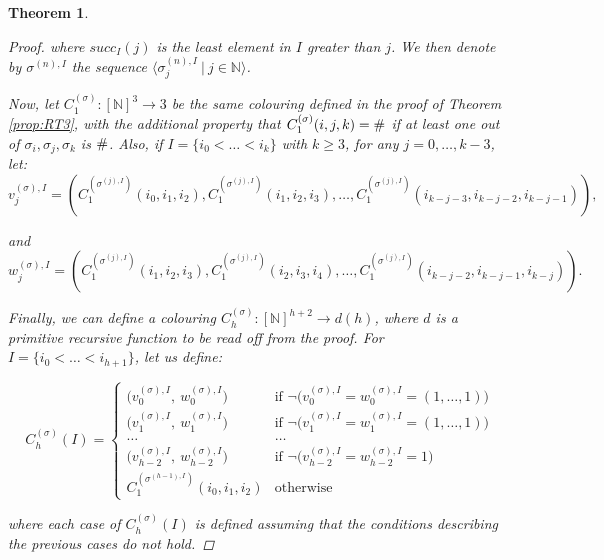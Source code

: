 \documentclass{amsart}
\newcommand\Nat{\mathbb{N}}
\newcommand\additionalsymbol{\text{\small{\#}}}
\newtheorem{theorem}{Theorem}
\begin{document}
\begin{theorem}
\begin{proof}
where $succ_I(j)$ is the least element in $I$ greater than $j$. 
We then denote by $\sigma^{(n),I}$ the sequence $\langle \sigma_j^{(n),I} \ |\ j \in \Nat \rangle$.


\medskip

Now, let $C_1^{(\sigma)}: [\Nat]^3 \rightarrow 3$ be the same colouring defined in the proof of Theorem \ref{prop:RT3}, with the additional property that $C_1^{(\sigma)}(i,j,k) = \additionalsymbol$ if at least one out of $\sigma_i, \sigma_j, \sigma_k$ is $\additionalsymbol$.
Also, if $I = \{i_0 < \ldots < i_k\}$ with $k \geq 3$, for any $j=0,\ldots,k-3$, let:
$$
v_j^{(\sigma), I} = (C_1^{(\sigma^{(j),I})}(i_0, i_1, i_2), C_1^{(\sigma^{(j),I})}(i_1, i_2, i_3), \ldots, C_1^{(\sigma^{(j),I})}(i_{k-j-3}, i_{k-j-2}, i_{k-j-1})),
$$

and
$$
w_j^{(\sigma), I} = (C_1^{(\sigma^{(j),I})}(i_1, i_2, i_3), C_1^{(\sigma^{(j),I})}(i_2, i_3, i_4), \ldots, C_1^{(\sigma^{(j),I})}(i_{k-j-2}, i_{k-j-1}, i_{k-j})).
$$



\bigskip

Finally, we can define a colouring $C_h^{(\sigma)} : [\Nat]^{h+2} \rightarrow d(h)$, where $d$ is a primitive recursive function to be read off from the proof.
For $I = \{i_0< \ldots< i_{h+1}\}$, let us define:

\begin{equation*}
C_h^{(\sigma)}(I) =
\begin{cases}
\big(v_0^{(\sigma), I},\ w_0^{(\sigma), I}\big)& \text{if } \neg\big(v_0^{(\sigma), I} = w_0^{(\sigma), I} = (1,\ldots,1)\big)\\[8pt]
\big(v_1^{(\sigma), I},\ w_1^{(\sigma), I}\big)& \text{if } \neg\big(v_1^{(\sigma), I} = w_1^{(\sigma), I} = (1,\ldots,1)\big)\\[8pt]
\ldots&\ldots\\[8pt]
\big(v_{h-2}^{(\sigma), I},\ w_{h-2}^{(\sigma), I}\big)& \text{if } \neg\big(v_{h-2}^{(\sigma), I} = w_{h-2}^{(\sigma), I} = 1\big)\\[8pt]
C_1^{(\sigma^{(h-1),I})}(i_0, i_1, i_2)& \text{otherwise}
\end{cases}
\end{equation*}

where each case of $C_h^{(\sigma)}(I)$ is defined assuming that the conditions describing the previous cases do not hold.


\end{proof}
\end{theorem}
\end{document}
